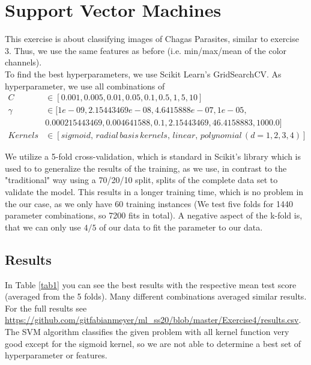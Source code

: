 \documentclass[a4paper,parskip=half-]{scrartcl}
\begin{document}
	\section*{Support Vector Machines}
	This exercise is about classifying images of Chagas Parasites, similar to exercise 3. Thus, we use the same features as before (i.e. min/max/mean of the color channels).\\
	To find the best hyperparameters, we use Scikit Learn's GridSearchCV. As hyperparameter, we use all combinations of
	\begin{align*}
		C &\in [0.001,0.005,0.01,0.05, 0.1,0.5, 1, 5, 10]\\
		\gamma & \in [1e-09, 2.15443469e-08,4.6415888e-07,	1e-05,\\ &0.000215443469,0.004641588,0.1,2.15443469,46.4158883,1000.0]\\
		Kernels & \in [sigmoid, \,radial\, basis\, kernels,\, linear,\, polynomial \,(d = 1, 2, 3, 4)]
	\end{align*}
	
	\noindent We utilize a 	5-fold cross-validation, which is standard in Scikit's library which is used to to generalize the results of the training, as we use, in contrast to the "traditional" way using a 70/20/10 split, splits of the complete data set to validate the model. This results in a longer training time, which is no problem in the our case, as we only have 60 training instances (We test five folds for 1440 parameter combinations, so 7200 fits in total). A negative aspect of the k-fold is, that we can only use $4/5$ of our data to fit the parameter to our data.
	\subsection*{Results}
	
	In Table \ref{tab1} you can see the best results with the respective mean test score (averaged from the 5 folds). Many different combinations averaged similar results. For the full results see \url{https://github.com/gitfabianmeyer/ml_ss20/blob/master/Exercise4/results.csv}. The SVM algorithm classifies the given problem with all kernel function very good except for the sigmoid kernel, so we are not able to determine a best set of hyperparameter or features.
	
\end{document}
